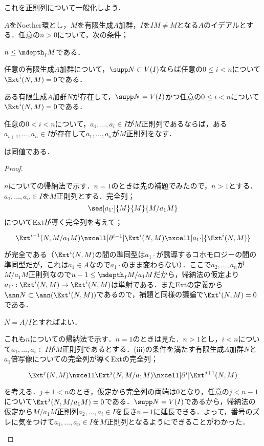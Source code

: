 これを正則列について一般化しよう．

\begin{prop}\label{prop:正則列とExt}
	$A$をNoether環とし，$M$を有限生成$A$加群，$I$を$IM\neq M$となる$A$のイデアルとする．任意の$n>0$について，次の条件；
	\begin{sakura}
		\item $n\leq\mdepth_I M$である．
		\item 任意の有限生成$A$加群について，$\supp N\subset V(I)$ならば任意の$0\leq i<n$について$\Ext^i(N,M)=0$である．
		\item ある有限生成$A$加群$N$が存在して，$\supp N=V(I)$かつ任意の$0\leq i<n$について$\Ext^i(N,M)=0$である．
		\item 任意の$0<i<n$について，$a_1,\dots,a_i\in I$が$M$正則列であるならば，ある$a_{i+1},\dots,a_n\in I$が存在して$a_1,\dots,a_n$が$M$正則列をなす．
	\end{sakura}
	は同値である．
\end{prop}

\begin{proof}
	\begin{eqv}[4]
		\item $n$についての帰納法で示す．$n=1$のときは先の補題でみたので，$n>1$とする．$a_1,\dots,a_n\in I$を$M$正則列とする．完全列；
		\[\ses[a_1\cdot]{M}{M}{M/a_1M}\]
		についてExtが導く完全列を考えて；
		\[\begin{tikzcd}{\Ext^{i-1}(N,M/a_1M)}\nxcell[\partial^{i-1}]{\Ext^i(N,M)}\nxcell[a_1\cdot]{\Ext^i(N,M)}\end{tikzcd}\]
		が完全である（$\Ext^i(N,M)$の間の準同型は$a_1\cdot$が誘導するコホモロジーの間の準同型だが，これは$a_1\in A$なので$a_1\cdot$のまま変わらない）．ここで$a_2,\dots,a_n$が$M/a_1M$正則列なので$n-1\leq\mdepth_I M/a_1M$だから，帰納法の仮定より$a_1\cdot:\Ext^i(N,M)\to\Ext^i(N,M)$は単射である．またExtの定義から$\ann N\subset\ann(\Ext^i(N,M))$であるので，補題と同様の議論で$\Ext^i(N,M)=0$である．
		\item $N=A/I$とすればよい．
		\item これも$n$についての帰納法で示す．$n=1$のときは見た．$n>1$とし，$i<n$について$a_1,\dots,a_i\in I$が$M$正則列であるとする．(iii)の条件を満たす有限生成$A$加群$N$と$a_1$倍写像についての完全列が導くExtの完全列；
		\[\begin{tikzcd}
		\Ext^{j}(N,M)\nxcell\Ext^{j}(N,M/a_1M)\nxcell[\partial^i]\Ext^{j+1}(N,M)
		\end{tikzcd}\]
		を考える．$j+1<n$のとき，仮定から完全列の両端は$0$となり，任意の$j<n-1$について$\Ext^j(N,M/a_1M)=0$である．$\supp N=V(I)$であるから，帰納法の仮定から$M/a_1M$正則列$a_2,\dots,a_i\in I$を長さ$n-1$に延長できる．よって，番号のズレに気をつけて$a_1,\dots,a_n\in I$を$M$正則列となるようにできることがわかった．
	\end{eqv}
\end{proof}

